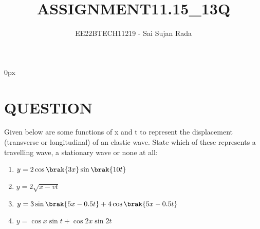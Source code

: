 \documentclass[journal,12pt,twocolumn]{IEEEtran}
\theoremstyle{remark}
\begin{document}
\parindent 0px

\vspace{3cm}

\title{ASSIGNMENT11.15\_13Q}
\author{EE22BTECH11219 - Sai Sujan Rada$^{}$%
}
\maketitle
\newpage
\bigskip

\section*{QUESTION}
Given below are some functions of x and t to 
represent the displacement (transverse
or longitudinal) of an elastic wave. State which of these represents \brak a travelling
wave,  a stationary wave or  none at all: \\
\begin{enumerate}
\item $y = 2\cos \brak{3x} \sin \brak{10t}$
\item $y=2\sqrt{x-vt}$
\item $y = 3\sin \brak{5x - 0.5t} + 4\cos \brak{5x - 0.5t}$
\item $y = \cos x \sin t + \cos 2x \sin 2t$
\end{enumerate}
\solution 
\end{document}
